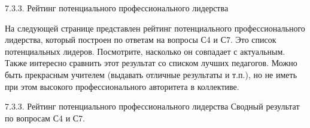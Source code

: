 \begin{frame}{7.3.3. Рейтинг потенциального профессионального лидерства}
\tiny 

На следующей странице представлен рейтинг потенциального профессионального лидерства, который построен по 
ответам на вопросы С4 и С7.
Это список потенциальных лидеров. 
Посмотрите, насколько он совпадает с актуальным. Также интересно сравнить этот результат со списком лучших педагогов. 
Можно быть прекрасным учителем (выдавать отличные результаты и т.п.), но не иметь при этом высокого профессионального 
авторитета в коллективе.
\end{frame}

\begin{frame}{7.3.3. Рейтинг потенциального профессионального лидерства}
\tiny 
Сводный результат по вопросам С4 и С7.

\fontsize{5pt}{5}\selectfont
\begin{center}
\begin{tabular}{cp{5cm}p{3cm}c}

\end{tabular}
\end{center}
\end{frame}


